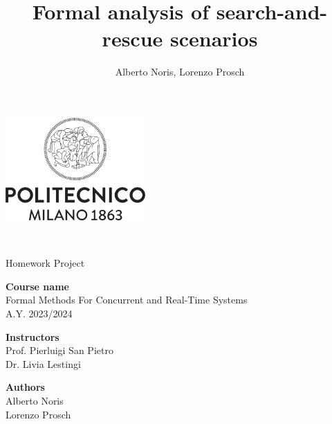 \documentclass[a4paper,12pt]{article}
\author{Alberto Noris, Lorenzo Prosch}
\title{Formal analysis of search-and-rescue scenarios}
\begin{document}
	
	\begin{center}
		
		\thispagestyle{empty}	%
		
		\includegraphics[width=0.4\textwidth]{root/images/extra/Logo_poli}
		
		\vspace{2cm}
		
		\textbf{\fontsize{32}{\baselineskip}\selectfont {Formal analysis of search-and-rescue scenarios}}\\
		
		\vspace{0.6cm}
		
		\fontsize{18}{\baselineskip}\selectfont Homework Project\\
		
		\vspace{2cm}
		
		\textbf{Course name}\\ 	{
			\setlength{\baselineskip}{1.4\baselineskip}
			Formal Methods For Concurrent and Real-Time Systems\\
			A.Y. 2023/2024\\
		}
		
		\vspace{1cm}
		
		\textbf{Instructors}\\
		{
			\setlength{\baselineskip}{1.4\baselineskip}
			Prof. Pierluigi San Pietro\\
			Dr. Livia Lestingi\\
		}
		
		\vspace{2cm}
		
		\textbf{Authors}\\
		{
			\setlength{\baselineskip}{1.4\baselineskip}
			Alberto Noris\\
			Lorenzo Prosch\\
		}
		
	\end{center}
	
	
	\clearpage
	\hypersetup{linkcolor=black}
	\tableofcontents
	\thispagestyle{empty}
	
	\renewcommand{\rmdefault}{phv}
	\renewcommand{\normalsize}{\fontsize{14}{17.4}\selectfont}
	\newpage

	
	
	
	
	
\end{document}
